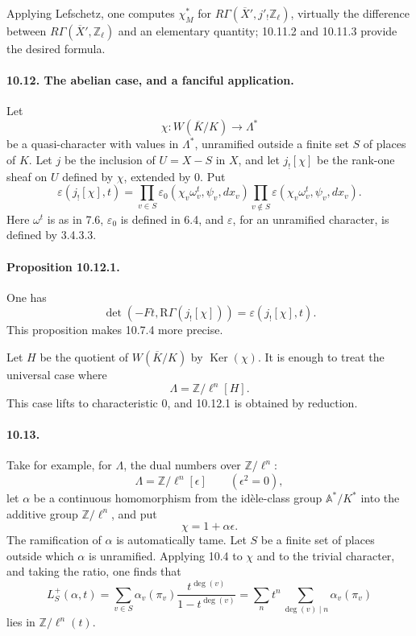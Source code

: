 \documentclass[10pt]{article}
\newcommand{\Z}{\mathbb Z}
\providecommand{\Ker}{\operatorname{Ker}}
\providecommand{\bbA}{\mathbb A}
\providecommand{\bbA}{\mathbb A}
\providecommand{\bbA}{\mathbb A}
\providecommand{\bbA}{\mathbb A}
\providecommand{\RGamma}{\mathrm R\Gamma}
\providecommand{\bbA}{\mathbb A}
\providecommand{\Ker}{\operatorname{Ker}}
\begin{document}
Applying Lefschetz, one computes \(\chi_M^*\) for \(R\Gamma(\overline X',j'_!\Z_\ell)\), virtually the difference between \(R\Gamma(\overline X',\Z_\ell)\) and an elementary quantity; 10.11.2 and 10.11.3 provide the desired formula.




\paragraph{10.12. The abelian case, and a fanciful application.} Let
\[
\chi:W(\overline K/K)\longrightarrow \Lambda^*
\]
be a quasi-character with values in \(\Lambda^*\), unramified outside a finite set \(S\) of places of \(K\). Let \(j\) be the inclusion of \(U=X-S\) in \(X\), and let \(j_![\chi]\) be the rank-one sheaf on \(U\) defined by \(\chi\), extended by \(0\). Put
\[
\varepsilon(j_![\chi],t)=
\prod_{v\in S}\varepsilon_0(\chi_v\omega_v^t,\psi_v,dx_v)
\prod_{v\notin S}\varepsilon(\chi_v\omega_v^t,\psi_v,dx_v).
\]
Here \(\omega^t\) is as in 7.6, \(\varepsilon_0\) is defined in 6.4, and \(\varepsilon\), for an unramified character, is defined by 3.4.3.3.

\paragraph{Proposition 10.12.1.} One has
\[
\det(-Ft,\RGamma(j_![\chi]))=\varepsilon(j_![\chi],t).
\]
This proposition makes 10.7.4 more precise.

Let \(H\) be the quotient of \(W(\overline K/K)\) by \(\Ker(\chi)\). It is enough to treat the universal case where
\[
\Lambda=\mathbb Z/\ell^n[H].
\]
This case lifts to characteristic \(0\), and 10.12.1 is obtained by reduction.

\paragraph{10.13.} Take for example, for \(\Lambda\), the dual numbers over \(\mathbb Z/\ell^n\):
\[
\Lambda=\mathbb Z/\ell^n[\epsilon]\qquad(\epsilon^2=0),
\]
let \(\alpha\) be a continuous homomorphism from the idèle-class group \(\bbA^*/K^*\) into the additive group \(\mathbb Z/\ell^n\), and put
\[
\chi=1+\alpha\epsilon.
\]
The ramification of \(\alpha\) is automatically tame. Let \(S\) be a finite set of places outside which \(\alpha\) is unramified. Applying 10.4 to \(\chi\) and to the trivial character, and taking the ratio, one finds that
\[
\tag{10.13.1}
L_S^+(\alpha,t)=
\sum_{v\in S}\alpha_v(\pi_v)\frac{t^{\deg(v)}}{1-t^{\deg(v)}}
=
\sum_n t^n\sum_{\deg(v)\mid n}\alpha_v(\pi_v)
\]
lies in \(\mathbb Z/\ell^n(t)\).
\end{document}
